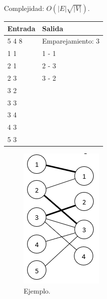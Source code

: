 \documentclass[12pt, letterpaper, twoside]{article}
\begin{document}
Complejidad: $O(|E|\sqrt{|V|})$.

 \medskip

\begin{tabular}{|p{7cm}|p{7cm}|}
\hline
\textbf{Entrada} & \textbf{Salida}\\ \hline
5 4 8 & Emparejamiento: 3\\
1 1   & 1 - 1\\
2 1   & 2 - 3\\
2 3   & 3 - 2\\
3 2   & \\
3 3   & \\
3 4   & \\
4 3   & \\
5 3   & \\ \hline
\end{tabular}

\begin{figure}[ht]
\centering
\includegraphics[height = 0.3\textheight]{MaxMatching.png}	

\caption{Ejemplo.}
\end{figure}

\newpage
\end{document}
